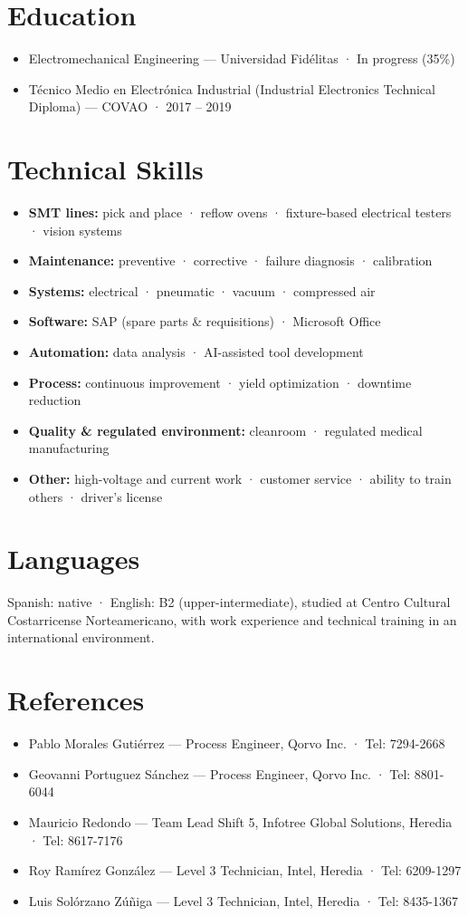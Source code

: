 \documentclass[10.5pt]{article}
\begin{document}
\section*{Education}
\begin{itemize}
\item Electromechanical Engineering --- Universidad Fidélitas · In progress (35\%)
\item Técnico Medio en Electrónica Industrial (Industrial Electronics Technical Diploma) --- COVAO · 2017 -- 2019
\end{itemize}

\section*{Technical Skills}
\begin{itemize}
\item \textbf{SMT lines:} pick and place · reflow ovens · fixture-based electrical testers · vision systems
\item \textbf{Maintenance:} preventive · corrective · failure diagnosis · calibration
\item \textbf{Systems:} electrical · pneumatic · vacuum · compressed air
\item \textbf{Software:} SAP (spare parts \& requisitions) · Microsoft Office
\item \textbf{Automation:} data analysis · AI-assisted tool development
\item \textbf{Process:} continuous improvement · yield optimization · downtime reduction
\item \textbf{Quality \& regulated environment:} cleanroom · regulated medical manufacturing
\item \textbf{Other:} high-voltage and current work · customer service · ability to train others · driver's license
\end{itemize}

\section*{Languages}
Spanish: native · English: B2 (upper-intermediate), studied at Centro Cultural Costarricense Norteamericano, with work experience and technical training in an international environment.

\section*{References}
\begin{itemize}
\item Pablo Morales Gutiérrez --- Process Engineer, Qorvo Inc. · Tel: 7294-2668
\item Geovanni Portuguez Sánchez --- Process Engineer, Qorvo Inc. · Tel: 8801-6044
\item Mauricio Redondo --- Team Lead Shift 5, Infotree Global Solutions, Heredia · Tel: 8617-7176
\item Roy Ramírez González --- Level 3 Technician, Intel, Heredia · Tel: 6209-1297
\item Luis Solórzano Zúñiga --- Level 3 Technician, Intel, Heredia · Tel: 8435-1367
\end{itemize}
\end{document}
